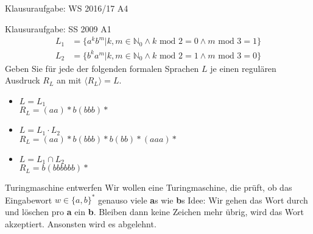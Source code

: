 \begin{frame}{Klausuraufgabe: WS 2016/17 A4}
  \begin{figure}
    \centering
  \end{figure}
\end{frame}

\begin{frame}{Klausuraufgabe: SS 2009 A1}
  \begin{align*}
    L_1 &= \{a^k b^m | k,m \in \mathbb{N}_0 \land k \text{ mod } 2 = 0 \land m \text{ mod } 3 = 1 \} \\
    L_2 &= \{b^k a^m | k,m \in \mathbb{N}_0 \land k \text{ mod } 2 = 1 \land m \text{ mod } 3 = 0 \}
  \end{align*}
  Geben Sie für jede der folgenden formalen Sprachen $L$ je einen regulären Ausdruck $R_L$ an mit $\langle R_L \rangle = L$.
  \begin{itemize}
    \item $L=L_1$\\
    \pause
    $R_L=(aa)*b(bbb)*$
    \pause
    \item $L=L_1 \cdot L_2$\\
    \pause
    $R_L=(aa)*b(bbb)*b(bb)*(aaa)*$
    \pause
    \item $L=L_1\cap L_2$\\
    \pause
    $R_L=b(bbbbbb)*$
  \end{itemize}
\end{frame}

\begin{frame}{Turingmaschine entwerfen}
Wir wollen eine Turingmaschine, die pr\"uft, ob das Eingabewort $w \in \{a,b\}^{*}$ genauso viele \textbf{a}s wie \textbf{b}s
\newline \newline Idee: Wir gehen das Wort durch und l\"oschen pro \textbf{a} ein \textbf{b}. Bleiben dann keine Zeichen mehr \"ubrig, wird das Wort akzeptiert. Ansonsten wird es abgelehnt.
\end{frame}

